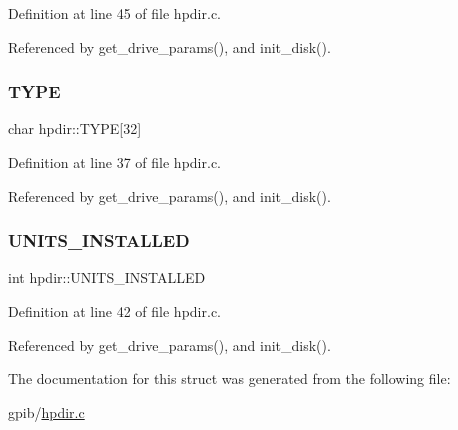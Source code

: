 Definition at line 45 of file hpdir.\+c.



Referenced by get\+\_\+drive\+\_\+params(), and init\+\_\+disk().

\mbox{\label{structhpdir_aee35438076503d0ae008b42cb02cb5f8}} 
\subsubsection{\texorpdfstring{T\+Y\+PE}{TYPE}}
{\footnotesize\ttfamily char hpdir\+::\+T\+Y\+PE\mbox{[}32\mbox{]}}



Definition at line 37 of file hpdir.\+c.



Referenced by get\+\_\+drive\+\_\+params(), and init\+\_\+disk().

\mbox{\label{structhpdir_ac7c95b0db81733f33d32228083a4fd2d}} 
\subsubsection{\texorpdfstring{U\+N\+I\+T\+S\+\_\+\+I\+N\+S\+T\+A\+L\+L\+ED}{UNITS\_INSTALLED}}
{\footnotesize\ttfamily int hpdir\+::\+U\+N\+I\+T\+S\+\_\+\+I\+N\+S\+T\+A\+L\+L\+ED}



Definition at line 42 of file hpdir.\+c.



Referenced by get\+\_\+drive\+\_\+params(), and init\+\_\+disk().



The documentation for this struct was generated from the following file\+:\begin{DoxyCompactItemize}
\item 
gpib/\hyperlink{hpdir_8c}{hpdir.\+c}\end{DoxyCompactItemize}
